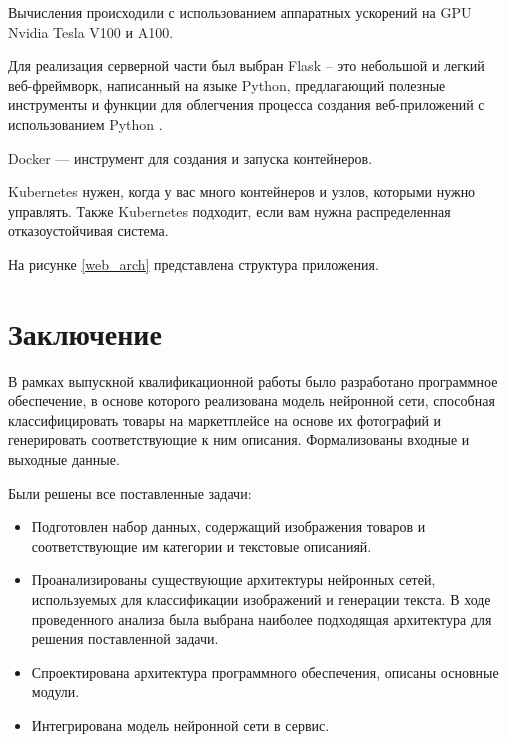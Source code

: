 \documentclass[a4paper,12pt]{extarticle}
\begin{document}
Вычисления происходили с использованием аппаратных ускорений на GPU Nvidia Tesla V100 и A100.

Для реализация серверной части был выбран Flask – это небольшой и легкий веб-фреймворк, написанный на языке Python, предлагающий полезные инструменты и функции для облегчения процесса создания веб-приложений с использованием Python \cite{flask}.

Docker — инструмент для создания и запуска контейнеров.

Kubernetes нужен, когда у вас много контейнеров и узлов, которыми нужно управлять. Также Kubernetes подходит, если вам нужна распределенная отказоустойчивая система.


На рисунке \ref{web_arch} представлена структура приложения.

\newpage
\section*{Заключение}

В рамках выпускной квалификационной работы было разработано программное обеспечение, в основе которого реализована модель нейронной сети, способная классифицировать товары на маркетплейсе на основе их фотографий и генерировать соответствующие к ним описания. Формализованы входные и выходные данные.

Были решены все поставленные задачи:
\begin{itemize}
	\item Подготовлен набор данных, содержащий изображения товаров и соответствующие им категории и текстовые описанияй.
	\item Проанализированы существующие архитектуры нейронных сетей, используемых для классификации изображений и генерации текста. В ходе проведенного анализа была выбрана наиболее подходящая архитектура для решения поставленной задачи.
	\item Спроектирована архитектура программного обеспечения, описаны основные модули.
	\item Интегрирована модель нейронной сети в сервис.
\end{itemize}
\end{document}
